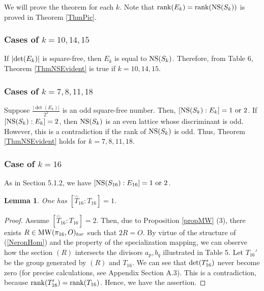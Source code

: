 \documentclass[10pt]{article}
\newtheorem{lem}{Lemma}[section]
\begin{document}
We will prove the theorem for each $k$.
Note  that  ${\rm rank}(E_k) = {\rm rank}({\rm NS}(S_k))$ is proved in Theorem \ref{ThmPic}.


\subsubsection{Cases of $k=10,14,15$}

If $|{\rm det} (E_k)|$ is square-free,
then $E_k$ is equal to ${\rm NS}(S_k)$.
Therefore, from Table 6, Theorem \ref{ThmNSEvident} is true if $k=10,14,15$.


\subsubsection{Cases of $k=7,8,11,18$}

Suppose $\frac{|{\det} (E_k)|}{2^2}$ is an odd square-free number.
Then, $\left[{\rm NS}(S_k): E_k \right] =1 \text{ or } 2$.
If $\left[{\rm NS}(S_k): E_k \right] = 2$, then ${\rm NS}(S_k)$ is an even lattice whose discriminant is odd.
However, this is a contradiction if the rank of ${\rm NS}(S_k)$ is odd.
Thus, Theorem \ref{ThmNSEvident} holds for $k=7,8,11,18$.


\subsubsection{Case of $k= 16$}

As in Section 5.1.2, we have $\left[{\rm NS}(S_{16}): E_{16} \right] =1 \text{ or } 2$.


\begin{lem}\label{LemCase1.1}
One has $\left[\widehat{T}_{16} : T_{16} \right]=1$.
\end{lem}

\begin{proof}
Assume $\left[\widehat{T}_{16} : T_{16} \right]= 2$. 
Then, due to Proposition \ref{propMW} (3), there exists $R\in {\rm MW}(\pi_{16}, O)_{tor}$ such that $2 R =O$.
By virtue of the structure of (\ref{NeronHom}) and the property of the specialization mapping,
we can observe how the section $(R)$ intersects the divisors $a_p, b_q$ illustrated in Table 5.
Let $T_{16}' $ be the group generated by $(R)$ and  $T_{16}$.
We can see that ${\rm det} (T_{16}' )$  never become zero (for precise calculations, see Appendix Section A.3).
This is a contradiction, because  ${\rm rank} (T_{16} ') = {\rm rank} (T_{16})$.
Hence, we have the assertion.
\end{proof}
\end{document}
